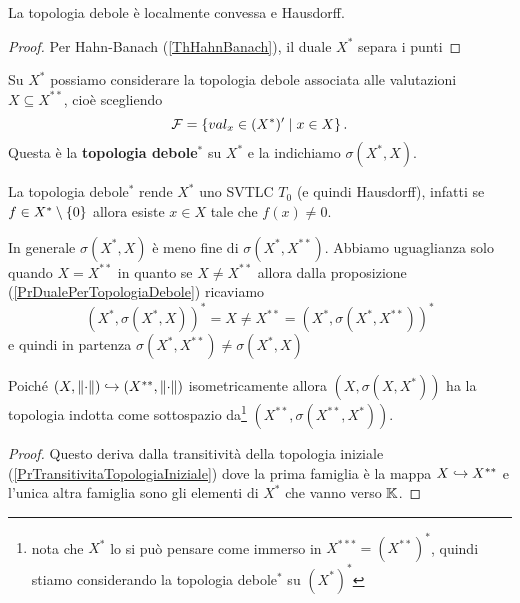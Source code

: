 \begin{proposition}
La topologia debole \`e localmente convessa e Hausdorff.
\end{proposition}
\begin{proof}
Per Hahn-Banach (\ref{ThHahnBanach}), il duale $X^\ast$ separa i punti
\end{proof}


\begin{definition}
Su $X^\ast$ possiamo considerare la topologia debole associata alle valutazioni $X\subseteq X^{\ast\ast}$, cio\`e scegliendo
\[\mathcal{F}=\left\{{val_x\in (X^\ast)'\mid x\in X}\right\}.\]
Questa \`e la \textbf{topologia debole$^\ast$} su $X^\ast$ e la indichiamo $\sigma(X^\ast,X)$.
\end{definition}

\begin{remark}
La topologia debole$^\ast$ rende $X^\ast$ uno SVTLC $T_0$ (e quindi Hausdorff), infatti se $f\in X^\ast\setminus\{0\}$ allora esiste $x\in X$ tale che $f(x)\neq 0$.
\end{remark}

\begin{remark}
In generale $\sigma(X^\ast,X)$ \`e meno fine di $\sigma(X^\ast,X^{\ast\ast})$. Abbiamo uguaglianza solo quando $X=X^{\ast\ast}$ in quanto se $X\neq X^{\ast\ast}$ allora dalla proposizione (\ref{PrDualePerTopologiaDebole}) ricaviamo
\[(X^\ast,\sigma(X^\ast,X))^\ast=X\neq X^{\ast\ast}=(X^\ast,\sigma(X^\ast,X^{\ast\ast}))^\ast\]
e quindi in partenza $\sigma(X^\ast,X^{\ast\ast})\neq \sigma(X^\ast,X)$
\end{remark}

\begin{remark}
Poich\'e $(X,{\left\Vert{\cdot}\right\Vert})\hookrightarrow (X^{\ast\ast},{\left\Vert{\cdot}\right\Vert})$ isometricamente allora $(X,\sigma(X,X^\ast))$ ha la topologia indotta come sottospazio da\footnote{nota che $X^\ast$ lo si pu\`o pensare come immerso in $X^{\ast\ast\ast}=(X^{\ast\ast})^\ast$, quindi stiamo considerando la topologia debole$^\ast$ su $(X^{\ast})^\ast$} $(X^{\ast\ast},\sigma(X^{\ast\ast},X^\ast))$.
\end{remark}
\begin{proof}
Questo deriva dalla transitivit\`a della topologia iniziale (\ref{PrTransitivitaTopologiaIniziale}) dove la prima famiglia \`e la mappa $X\hookrightarrow X^{\ast\ast}$ e l'unica altra famiglia sono gli elementi di $X^\ast$ che vanno verso $\mathbb{K}$.
\end{proof}


